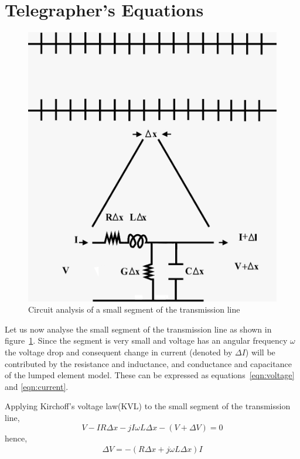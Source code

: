 \section{Telegrapher's Equations}
\begin{figure}[h]
\centering
\includegraphics[scale=0.4]{./graphics/fig 2-11}
\caption{Circuit analysis of a small segment of the transmission line}
\label{fig:seventh}
\end{figure}

Let us now analyse the small segment of the transmission line as shown in figure~\ref{fig:seventh}. Since the segment is very small and voltage has an angular frequency $ \omega $ the voltage drop and consequent change in current (denoted by $\Delta I$) will be contributed by the resistance and inductance, and conductance and capacitance of the lumped element model. These can be expressed as equations~\eqref{eqn:voltage} and \eqref{eqn:current}.

Applying Kirchoff's voltage law(KVL) to the small segment of the transmission line,
\begin{dmath*}
V  - IR\Delta x - jI\omega L\Delta x - (V + \Delta V) = 0
\end{dmath*}
hence,
\begin{align}  
\Delta V = - (R \Delta x + j\omega L\Delta x)I
\label{eqn:voltage}
\end{align}

